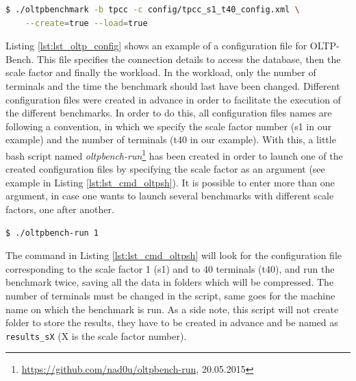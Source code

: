 {
\singlespacing
\begin{lstlisting}[frame=single,language=bash,caption={Database population command},label={lst:lst_cmd_oltpbenchmark}]
  $ ./oltpbenchmark -b tpcc -c config/tpcc_s1_t40_config.xml \
    --create=true --load=true
\end{lstlisting}
}

Listing \ref{lst:lst_oltp_config} shows an example of a configuration file for OLTP-Bench. 
This file specifies the connection details to access the database, then the scale factor and finally the workload. 
In the workload, only the number of terminals and the time the benchmark should last have been changed. 
Different configuration files were created in advance in order to facilitate the execution of the different benchmarks. 
In order to do this, all configuration files names are following a convention, in which we specify the scale factor number (s1 in our example) and the number of terminals (t40 in our example).
With this, a little bash script named \textit{oltpbench-run}\footnote{\url{https://github.com/nad0u/oltpbench-run}, 20.05.2015} 
has been created in order to launch one of the created configuration files by specifying the scale factor as an argument (see example in Listing \ref{lst:lst_cmd_oltpsh}).
It is possible to enter more than one argument, in case one wants to launch several benchmarks with different scale factors, one after another.

{
\singlespacing
\begin{lstlisting}[frame=single,language=bash,caption={Bash script for launching benchmarks},label={lst:lst_cmd_oltpsh}]
  $ ./oltpbench-run 1
\end{lstlisting}
}

The command in Listing \ref{lst:lst_cmd_oltpsh} will look for the configuration file corresponding to the scale factor 1 (s1) and to 40 terminals (t40), and run the benchmark twice, saving all the data in folders which will be compressed.
The number of terminals must be changed in the script, same goes for the machine name on which the benchmark is run.
As a side note, this script will not create folder to store the results, they have to be created in advance and be named as \texttt{results\_sX} (X is the scale factor number).

{
\singlespacing
{}
    
}








